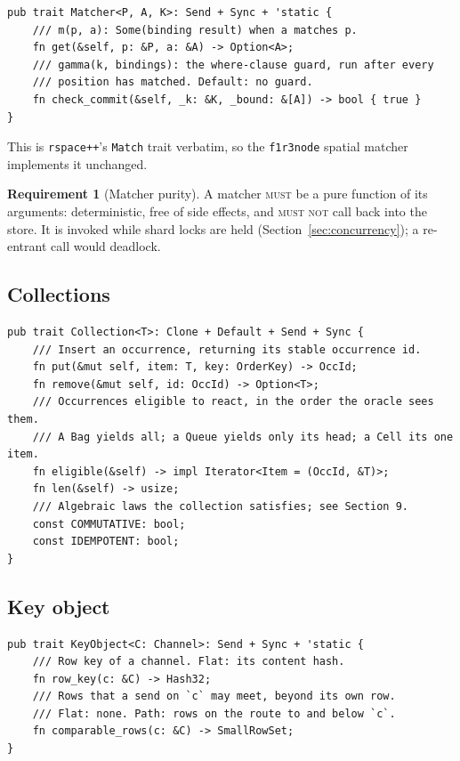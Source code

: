 \documentclass[11pt]{article}
\theoremstyle{plain}
\theoremstyle{definition}
\newtheorem{requirement}{Requirement}
\newcommand{\MUST}{\textsc{must}}
\newcommand{\MUSTNOT}{\textsc{must not}}
\newcommand{\code}[1]{\texttt{#1}}
\begin{document}
\begin{lstlisting}
pub trait Matcher<P, A, K>: Send + Sync + 'static {
    /// m(p, a): Some(binding result) when a matches p.
    fn get(&self, p: &P, a: &A) -> Option<A>;
    /// gamma(k, bindings): the where-clause guard, run after every
    /// position has matched. Default: no guard.
    fn check_commit(&self, _k: &K, _bound: &[A]) -> bool { true }
}
\end{lstlisting}

This is \code{rspace++}'s \code{Match} trait verbatim, so the \code{f1r3node}
spatial matcher implements it unchanged.

\begin{requirement}[Matcher purity]\label{req:pure}
A matcher \MUST{} be a pure function of its arguments: deterministic, free of side
effects, and \MUSTNOT{} call back into the store. It is invoked while shard locks
are held (Section~\ref{sec:concurrency}); a re-entrant call would deadlock.
\end{requirement}

\subsection{Collections}

\begin{lstlisting}
pub trait Collection<T>: Clone + Default + Send + Sync {
    /// Insert an occurrence, returning its stable occurrence id.
    fn put(&mut self, item: T, key: OrderKey) -> OccId;
    fn remove(&mut self, id: OccId) -> Option<T>;
    /// Occurrences eligible to react, in the order the oracle sees them.
    /// A Bag yields all; a Queue yields only its head; a Cell its one item.
    fn eligible(&self) -> impl Iterator<Item = (OccId, &T)>;
    fn len(&self) -> usize;
    /// Algebraic laws the collection satisfies; see Section 9.
    const COMMUTATIVE: bool;
    const IDEMPOTENT: bool;
}
\end{lstlisting}

\subsection{Key object}

\begin{lstlisting}
pub trait KeyObject<C: Channel>: Send + Sync + 'static {
    /// Row key of a channel. Flat: its content hash.
    fn row_key(c: &C) -> Hash32;
    /// Rows that a send on `c` may meet, beyond its own row.
    /// Flat: none. Path: rows on the route to and below `c`.
    fn comparable_rows(c: &C) -> SmallRowSet;
}
\end{lstlisting}
\end{document}
